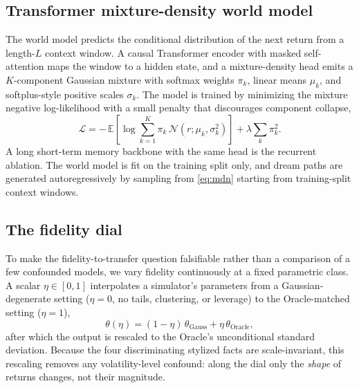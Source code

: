 \documentclass[conference]{IEEEtran}
\begin{document}
\subsection{Transformer mixture-density world model}\label{sec:wm}
The world model predicts the conditional distribution of the next return from a length-$L$ context window. A causal Transformer encoder with masked self-attention maps the window to a hidden state, and a mixture-density head emits a $K$-component Gaussian mixture with softmax weights $\pi_k$, linear means $\mu_k$, and softplus-style positive scales $\sigma_k$. The model is trained by minimizing the mixture negative log-likelihood with a small penalty that discourages component collapse,
\begin{equation}
\mathcal{L} = -\,\mathbb{E}\!\left[\log \sum_{k=1}^{K} \pi_k \, \mathcal{N}(r;\mu_k,\sigma_k^2)\right] + \lambda \sum_k \pi_k^2 .
\label{eq:mdn}
\end{equation}
A long short-term memory backbone with the same head is the recurrent ablation. The world model is fit on the training split only, and dream paths are generated autoregressively by sampling from \eqref{eq:mdn} starting from training-split context windows.

\subsection{The fidelity dial}\label{sec:dial}
To make the fidelity-to-transfer question falsifiable rather than a comparison of a few confounded models, we vary fidelity continuously at a fixed parametric class. A scalar $\eta \in [0,1]$ interpolates a simulator's parameters from a Gaussian-degenerate setting ($\eta=0$, no tails, clustering, or leverage) to the Oracle-matched setting ($\eta=1$),
\begin{equation}
\theta(\eta) = (1-\eta)\,\theta_{\text{Gauss}} + \eta\,\theta_{\text{Oracle}},
\label{eq:dial}
\end{equation}
after which the output is rescaled to the Oracle's unconditional standard deviation. Because the four discriminating stylized facts are scale-invariant, this rescaling removes any volatility-level confound: along the dial only the \emph{shape} of returns changes, not their magnitude.
\end{document}
